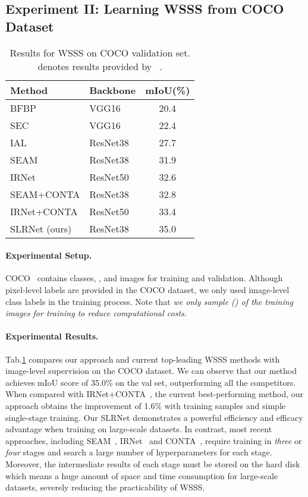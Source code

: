 \documentclass[twocolumn]{svjour3}          \smartqed  \usepackage{graphicx}
\makeatletter
\newcommand{\Tab}{Tab.\@\xspace}
\makeatother
\begin{document}
\subsection{Experiment II: Learning WSSS from COCO Dataset}

\begin{table}[!t]
  \begin{tabularx}{\linewidth}{@{}Xlc@{}}
  \toprule
  Method & Backbone & {mIoU(\%)}\\
  \midrule
  BFBP  \citep{SalehASPGA16:BFBP}  & VGG16  &  20.4  \\
  SEC \tiny\citep{KolesnikovL16:SEC}   & VGG16  &  22.4  \\
  IAL \citep{WangLMY20:WSSSIAL} & ResNet38  &  27.7  \\
  SEAM \citep{WangZKSC20:SEAM} & ResNet38  &  31.9  \\
  IRNet \citep{AhnCK19:IRN} & ResNet50  &  32.6  \\
  SEAM+CONTA \citep{dong_2020:conta} & ResNet38  &  32.8  \\
  IRNet+CONTA \citep{dong_2020:conta} & ResNet50  &  33.4  \\
  \midrule 
  SLRNet (ours) &  {ResNet38}   & {35.0} \\
  \bottomrule
  \end{tabularx}
  \caption{Results for WSSS on COCO validation set.  denotes results provided by ~\cite{dong_2020:conta}.}
  \label{table:COCO_result}
\end{table}

\paragraph{Experimental Setup.}
COCO~\citep{LinMBHPRDZ14:COCO} contains  classes, , and  images for training and validation. Although pixel-level labels are provided in the COCO dataset, we only used image-level class labels in the training process.
Note that \textit{we only sample  () of the training images for training to reduce computational costs.}

\paragraph{Experimental Results.}
\Tab\ref{table:COCO_result} compares our approach and current top-leading WSSS methods with image-level supervision on the COCO dataset. 
We can observe that our method achieves mIoU score of 35.0\% on the val set, outperforming all the competitors.
When compared with IRNet+CONTA~\citep{dong_2020:conta}, the current best-performing method, our approach obtains the improvement of 1.6\% with  training samples and simple single-stage training.
Our SLRNet demonstrates a powerful efficiency and efficacy advantage when training on large-scale datasets.
In contrast, most recent approaches, including SEAM~\citep{WangZKSC20:SEAM}, IRNet~\citep{AhnCK19:IRN} and CONTA~\citep{dong_2020:conta}, require training in \textit{three} or \textit{four} stages and search a large number of hyperparameters for each stage.
Moreover, the intermediate results of each stage must be stored on the hard disk which means a huge amount of space and time consumption for large-scale datasets, severely reducing the practicability of WSSS.
\end{document}

